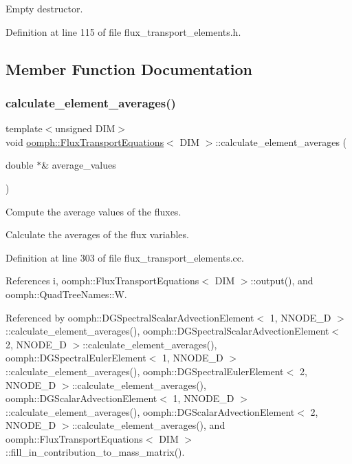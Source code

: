 Empty destructor. 



Definition at line 115 of file flux\+\_\+transport\+\_\+elements.\+h.



\subsection{Member Function Documentation}
\mbox{\label{classoomph_1_1FluxTransportEquations_a76f71716bef2734cadcd5f79a9d8e469}} 
\subsubsection{\texorpdfstring{calculate\+\_\+element\+\_\+averages()}{calculate\_element\_averages()}}
{\footnotesize\ttfamily template$<$unsigned D\+IM$>$ \\
void \hyperlink{classoomph_1_1FluxTransportEquations}{oomph\+::\+Flux\+Transport\+Equations}$<$ D\+IM $>$\+::calculate\+\_\+element\+\_\+averages (\begin{DoxyParamCaption}\item[{double $\ast$\&}]{average\+\_\+values }\end{DoxyParamCaption})}



Compute the average values of the fluxes. 

Calculate the averages of the flux variables. 

Definition at line 303 of file flux\+\_\+transport\+\_\+elements.\+cc.



References i, oomph\+::\+Flux\+Transport\+Equations$<$ D\+I\+M $>$\+::output(), and oomph\+::\+Quad\+Tree\+Names\+::W.



Referenced by oomph\+::\+D\+G\+Spectral\+Scalar\+Advection\+Element$<$ 1, N\+N\+O\+D\+E\+\_\+D $>$\+::calculate\+\_\+element\+\_\+averages(), oomph\+::\+D\+G\+Spectral\+Scalar\+Advection\+Element$<$ 2, N\+N\+O\+D\+E\+\_\+D $>$\+::calculate\+\_\+element\+\_\+averages(), oomph\+::\+D\+G\+Spectral\+Euler\+Element$<$ 1, N\+N\+O\+D\+E\+\_\+D $>$\+::calculate\+\_\+element\+\_\+averages(), oomph\+::\+D\+G\+Spectral\+Euler\+Element$<$ 2, N\+N\+O\+D\+E\+\_\+D $>$\+::calculate\+\_\+element\+\_\+averages(), oomph\+::\+D\+G\+Scalar\+Advection\+Element$<$ 1, N\+N\+O\+D\+E\+\_\+D $>$\+::calculate\+\_\+element\+\_\+averages(), oomph\+::\+D\+G\+Scalar\+Advection\+Element$<$ 2, N\+N\+O\+D\+E\+\_\+D $>$\+::calculate\+\_\+element\+\_\+averages(), and oomph\+::\+Flux\+Transport\+Equations$<$ D\+I\+M $>$\+::fill\+\_\+in\+\_\+contribution\+\_\+to\+\_\+mass\+\_\+matrix().

